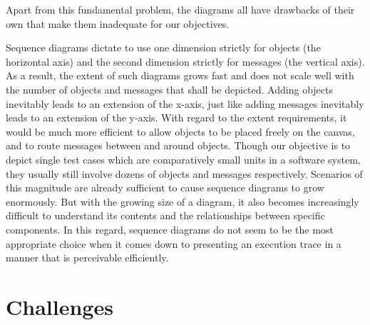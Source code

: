Apart from this fundamental problem, the diagrams all have drawbacks of their own that make them inadequate for our objectives.

Sequence diagrams dictate to use one dimension strictly for objects (the horizontal axis) and the second dimension strictly for messages (the vertical axis).
As a result, the extent of such diagrams grows fast and does not scale well with the number of objects and messages that shall be depicted.
Adding objects inevitably leads to an extension of the x-axis, just like adding messages inevitably leads to an extension of the y-axis.
With regard to the extent requirements, it would be much more efficient to allow objects to be placed freely on the canvas, and to route messages between and around objects.
Though our objective is to depict single test cases which are comparatively small units in a software system, they usually still involve dozens of objects and messages respectively.
Scenarios of this magnitude are already sufficient to cause sequence diagrams to grow enormously.
But with the growing size of a diagram, it also becomes increasingly difficult to understand its contents and the relationships between specific components.
In this regard, sequence diagrams do not seem to be the most appropriate choice when it comes down to presenting an execution trace in a manner that is perceivable efficiently.


\section{Challenges}
